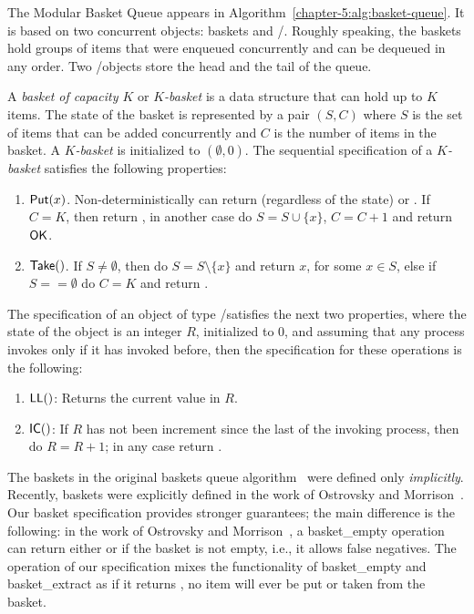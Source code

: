 The Modular Basket Queue appears in Algorithm~\ref{chapter-5:alg:basket-queue}. It is based on two concurrent objects: baskets and \LL/\IC. Roughly speaking, the baskets hold groups of items that were enqueued concurrently and can be dequeued in any order. Two \LL/\IC objects store the head and the tail of the queue.

\begin{definition}[\(K\)-Basket]
\label{chapter-5:def:k-basket}
A \emph{basket of capacity $K$} or \emph{$K$-basket} is a data structure that can hold up to $K$ items. The state of the basket is represented by a pair $(S, C)$ where $S$ is the set of items that can be added concurrently and $C$ is the number of items in the basket. A \emph{$K$-basket} is initialized to $(\emptyset, 0)$. The sequential specification of a \emph{$K$-basket} satisfies the following properties:

\begin{enumerate}
    \item ${\sf Put}(x)$. Non-deterministically can return \full (regardless of the state) or \ok. If $C = K$, then return \full, in another case do $S = S \cup \{x\}$, $C = C +1$ and return ${\sf OK}$.
    \item ${\sf Take}()$. If $S \neq \emptyset$, then do $S = S \setminus \{x\}$ and return $x$, for some $x \in S$, else if $S == \emptyset$ do $C = K$ and return \closed.
\end{enumerate}
\end{definition}

\begin{definition}
  \label{chapter-5:def:ll-ic}
    The specification of an object of type \LL/\IC satisfies the next two properties, where the state of the object is an integer $R$, initialized to 0, and assuming that any process invokes \IC only if it has invoked \LL before, then the specification for these operations is the following:

    \begin{enumerate}
    \item ${\sf LL}()$: Returns the current value in $R$.
    \item ${\sf IC}()$: If $R$ has not been increment since the last \LL of the invoking process,
    then do $R = R + 1$; in any case return \ok.
    \end{enumerate}
\end{definition}

The baskets in the original baskets queue algorithm~\cite{basketqueue2007} were defined only \emph{implicitly}. Recently, baskets were explicitly defined in the work of Ostrovsky and Morrison~\cite{scalingconcurrent2020}. Our basket specification provides stronger guarantees; the main difference is the following: in the work of Ostrovsky and Morrison~\cite{scalingconcurrent2020}, a {\sf basket\_empty} operation can return either \true or \false if the basket is not empty, i.e., it allows false negatives. The \Take operation of our specification mixes the functionality of {\sf basket\_empty} and {\sf basket\_extract} as if it returns \closed, no item will ever be put or taken from the basket.

